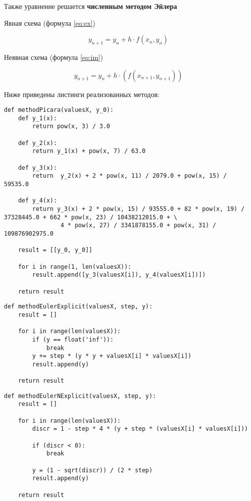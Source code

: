 Также уравнение решается \textbf{численным методом Эйлера}

Явная схема (формула \ref{eq:ex})

\begin{equation}\label{eq:ex}
    y_{n+1} = y_n + h \cdot f(x_n, y_n)
\end{equation}

Неявная схема (формула \ref{eq:im})

\begin{equation}\label{eq:im}
    y_{n+1} = y_n + h \cdot (f(x_{n+1}, y_{n+1}))
\end{equation}

Ниже приведены листинги реализованных методов:

\begin{lstlisting}[caption=Метод Пикара]
def methodPicara(valuesX, y_0):
    def y_1(x):
        return pow(x, 3) / 3.0

    def y_2(x):
        return y_1(x) + pow(x, 7) / 63.0

    def y_3(x):
        return  y_2(x) + 2 * pow(x, 11) / 2079.0 + pow(x, 15) / 59535.0

    def y_4(x):
        return y_3(x) + 2 * pow(x, 15) / 93555.0 + 82 * pow(x, 19) / 37328445.0 + 662 * pow(x, 23) / 10438212015.0 + \
                4 * pow(x, 27) / 3341878155.0 + pow(x, 31) / 109876902975.0

    result = [[y_0, y_0]]

    for i in range(1, len(valuesX)):
        result.append([y_3(valuesX[i]), y_4(valuesX[i])])

    return result
\end{lstlisting}

\begin{lstlisting}[caption=Явная схема метода Эйлера]
def methodEulerExplicit(valuesX, step, y):
    result = []

    for i in range(len(valuesX)):
        if (y == float('inf')):
            break
        y += step * (y * y + valuesX[i] * valuesX[i])
        result.append(y)

    return result
\end{lstlisting}

\begin{lstlisting}[caption=Неявная схема метода Эйлера]
def methodEulerNExplicit(valuesX, step, y):
    result = []

    for i in range(len(valuesX)):
        discr = 1 - step * 4 * (y + step * (valuesX[i] * valuesX[i]))

        if (discr < 0):
            break

        y = (1 - sqrt(discr)) / (2 * step)
        result.append(y)

    return result
\end{lstlisting}

